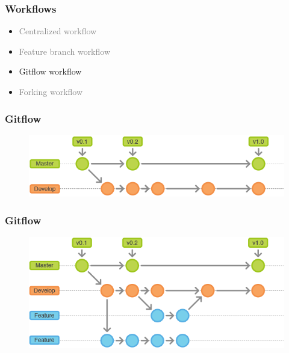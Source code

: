 \documentclass{beamer}
\begin{document}
\begin{frame}
    \frametitle{Workflows}
    \begin{itemize}
        \item \textcolor{gray}{Centralized workflow}
        \item \textcolor{gray}{Feature branch workflow}
        \item Gitflow workflow
        \item \textcolor{gray}{Forking workflow}
    \end{itemize}
\end{frame}

\begin{frame}
    \frametitle{Gitflow}
    \begin{figure}[h!]
        \begin{center}
            \includegraphics[scale=0.5]{gitflow2.png}
        \end{center}
    \end{figure}
\end{frame}

\begin{frame}
    \frametitle{Gitflow}
    \begin{figure}[h!]
        \begin{center}
            \includegraphics[scale=0.5]{gitflow3.png}
        \end{center}
    \end{figure}
\end{frame}
\end{document}
